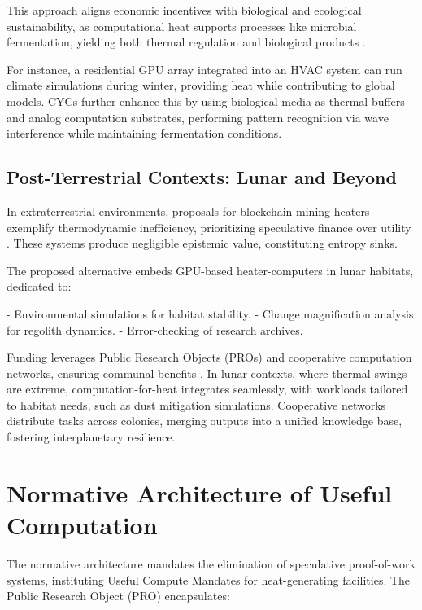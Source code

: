 \documentclass[12pt]{article}
\begin{document}
This approach aligns economic incentives with biological and ecological sustainability, as computational heat supports processes like microbial fermentation, yielding both thermal regulation and biological products \citep{CapraLuisi2014, MargulisSagan1995}.

For instance, a residential GPU array integrated into an HVAC system can run climate simulations during winter, providing heat while contributing to global models. CYCs further enhance this by using biological media as thermal buffers and analog computation substrates, performing pattern recognition via wave interference while maintaining fermentation conditions.

\subsection{Post-Terrestrial Contexts: Lunar and Beyond}

In extraterrestrial environments, proposals for blockchain-mining heaters exemplify thermodynamic inefficiency, prioritizing speculative finance over utility \citep{ODwyerMalone2014, Mora2018, DeVries2021}. These systems produce negligible epistemic value, constituting entropy sinks.

The proposed alternative embeds GPU-based heater-computers in lunar habitats, dedicated to:

- Environmental simulations for habitat stability.
- Change magnification analysis for regolith dynamics.
- Error-checking of research archives.

Funding leverages Public Research Objects (PROs) and cooperative computation networks, ensuring communal benefits \citep{Carrier1991, Spudis2016, NASAArtemis2023}. In lunar contexts, where thermal swings are extreme, computation-for-heat integrates seamlessly, with workloads tailored to habitat needs, such as dust mitigation simulations. Cooperative networks distribute tasks across colonies, merging outputs into a unified knowledge base, fostering interplanetary resilience.

\section{Normative Architecture of Useful Computation}
\label{sec:normative-architecture}

The normative architecture mandates the elimination of speculative proof-of-work systems, instituting Useful Compute Mandates for heat-generating facilities. The Public Research Object (PRO) encapsulates:
\end{document}
